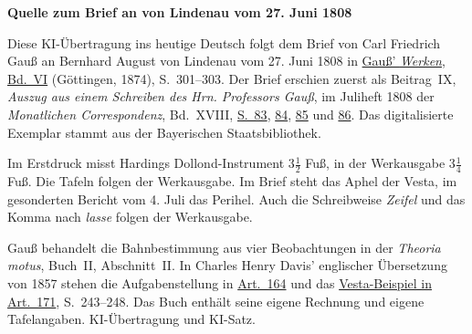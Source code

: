 \clearpage\thispagestyle{empty}
\begin{center}\textbf{Quelle zum Brief an von Lindenau vom 27. Juni 1808}\end{center}
\noindent Diese KI-Übertragung ins heutige Deutsch folgt dem Brief von Carl Friedrich Gauß an Bernhard August von Lindenau vom 27. Juni 1808 in \href{https://gdz.sub.uni-goettingen.de/id/PPN236007467}{Gauß’ \textit{Werken}, Bd.~VI} (Göttingen, 1874), S.~301--303. Der Brief erschien zuerst als Beitrag~IX, \textit{Auszug aus einem Schreiben des Hrn. Professors Gauß}, im Juliheft 1808 der \textit{Monatlichen Correspondenz}, Bd.~XVIII, \href{https://www.digitale-sammlungen.de/en/view/bsb10538609?page=95}{S.~83}, \href{https://www.digitale-sammlungen.de/en/view/bsb10538609?page=96}{84}, \href{https://www.digitale-sammlungen.de/en/view/bsb10538609?page=97}{85} und \href{https://www.digitale-sammlungen.de/en/view/bsb10538609?page=98}{86}. Das digitalisierte Exemplar stammt aus der Bayerischen Staatsbibliothek.
\par\medskip
Im Erstdruck misst Hardings Dollond-Instrument $3\tfrac12$ Fuß, in der Werkausgabe $3\tfrac14$ Fuß. Die Tafeln folgen der Werkausgabe. Im Brief steht das Aphel der Vesta, im gesonderten Bericht vom 4. Juli das Perihel. Auch die Schreibweise \textit{Zeifel} und das Komma nach \textit{lasse} folgen der Werkausgabe.
\par\medskip
Gauß behandelt die Bahnbestimmung aus vier Beobachtungen in der \textit{Theoria motus}, Buch~II, Abschnitt~II. In Charles Henry Davis’ englischer Übersetzung von 1857 stehen die Aufgabenstellung in \href{https://www2.karlin.mff.cuni.cz/~tuma/Aplikace21/theoryofmotionof00gausuoft.pdf#page=258}{Art.~164} und das \href{https://www2.karlin.mff.cuni.cz/~tuma/Aplikace21/theoryofmotionof00gausuoft.pdf#page=267}{Vesta-Beispiel in Art.~171}, S.~243--248. Das Buch enthält seine eigene Rechnung und eigene Tafelangaben. KI-Übertragung und KI-Satz.
\clearpage
